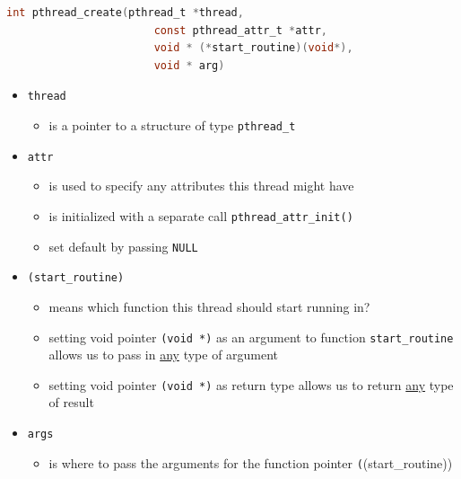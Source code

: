 \documentclass[12pt]{article}
\begin{document}
\begin{enumerate}[1.]
\begin{enumerate}[a)]
\begin{itemize}
\begin{itemize}
                \bigskip
\begin{lstlisting}[language=c]
    int pthread_create(pthread_t *thread,
                       const pthread_attr_t *attr,
                       void * (*start_routine)(void*),
                       void * arg)
\end{lstlisting}

                \begin{itemize}
                    \item \texttt{thread}

                    \begin{itemize}
                        \item is a pointer to a structure of type \texttt{pthread\_t}
                    \end{itemize}
                    \item \texttt{attr}

                    \begin{itemize}
                        \item is used to specify any attributes this thread might have
                        \item is initialized with a separate call \texttt{pthread\_attr\_init()}
                        \item set default by passing \texttt{NULL}
                    \end{itemize}

                    \item \texttt{(start\_routine)}

                    \begin{itemize}
                        \item means which function this thread should start running in?
                        \item setting void pointer \texttt{(void *)} as an argument to function \texttt{start\_routine}
                        allows us to pass in \underline{any} type of argument
                        \item setting void pointer \texttt{(void *)} as return type allows us to return
                        \underline{any} type of result
                    \end{itemize}

                    \item \texttt{args}

                    \begin{itemize}
                        \item is where to pass the arguments for the function pointer \texttt((start\_routine))
                    \end{itemize}


\end{itemize}
\end{itemize}
\end{itemize}
\end{enumerate}
\end{enumerate}
\end{document}
